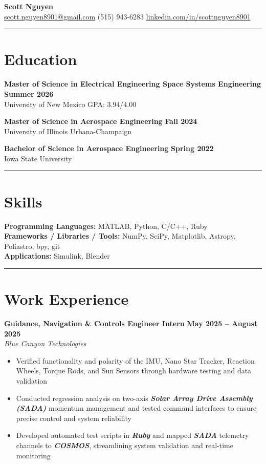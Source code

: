 \documentclass[10pt]{article}
\newcommand{\sectionline}{\noindent\rule{\linewidth}{0.4pt}}
\begin{document}
	
	\begin{center}
		{\color{mygreen}
			{\Huge \textbf{Scott Nguyen}} \\
			\href{mailto:scott.nguyen8901@gmail.com}{scott.nguyen8901@gmail.com} \quad \textbar \quad 
			(515) 943-6283 \quad \textbar \quad 
			\href{https://www.linkedin.com/in/scottnguyen8901/}{linkedin.com/in/scottnguyen8901}
		}
	\end{center}
	
	\sectionline
	
	\section*{Education}
	
	\textbf{Master of Science in Electrical Engineering \textbar Space Systems Engineering} \hfill \textbf{Summer 2026} \\
	University of New Mexico \hfill GPA: 3.94/4.00
	
	\textbf{Master of Science in Aerospace Engineering} \hfill \textbf{Fall 2024} \\
	University of Illinois Urbana-Champaign
	
	\textbf{Bachelor of Science in Aerospace Engineering} \hfill \textbf{Spring 2022} \\
	Iowa State University
	
	\sectionline
	
	\section*{Skills}
	\textbf{Programming Languages:} MATLAB, Python, C/C++, Ruby \\
	\textbf{Frameworks / Libraries / Tools:} NumPy, SciPy, Matplotlib, Astropy, Poliastro, bpy, git \\
	\textbf{Applications:} Simulink, Blender
	
	\sectionline
	
	\section*{Work Experience}
	
	\textbf{Guidance, Navigation \& Controls Engineer Intern} \hfill \textbf{May 2025 – August 2025} \\
	\emph{Blue Canyon Technologies}
	\begin{itemize}
	    \item Verified functionality and polarity of the IMU, Nano Star Tracker, Reaction Wheels, Torque Rods, and Sun Sensors through hardware testing and data validation
	    \item Conducted regression analysis on two-axis \textbf{\emph{Solar Array Drive Assembly (SADA)}} momentum management and tested command interfaces to ensure 			   precise control and system reliability
	    \item Developed automated test scripts in \textbf{\emph{Ruby}} and mapped \textbf{\emph{SADA}} telemetry channels to \textbf{\emph{COSMOS}}, streamlining system 		    validation and real-time monitoring
	\end{itemize}
\end{document}
